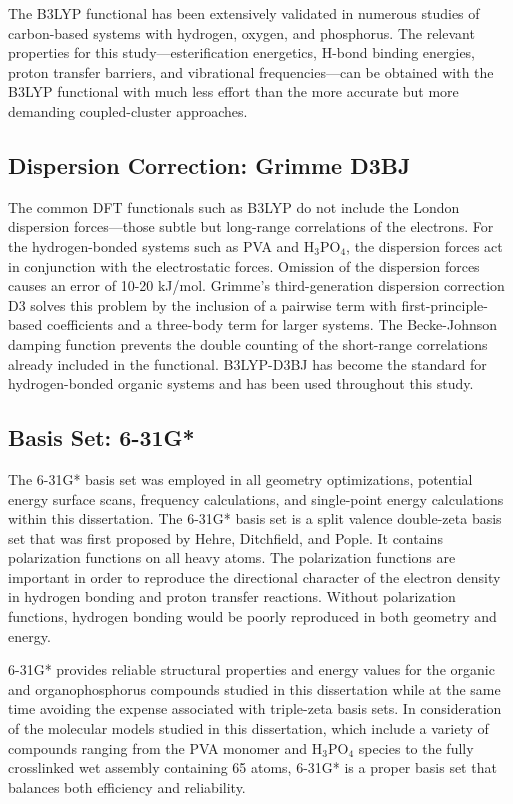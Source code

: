 \documentclass[12pt,a4paper]{report}
\begin{document}
The B3LYP functional has been extensively validated in numerous studies of carbon-based systems with hydrogen, oxygen, and phosphorus.\cite{72,73} The relevant properties for this study—esterification energetics, H-bond binding energies, proton transfer barriers, and vibrational frequencies—can be obtained with the B3LYP functional with much less effort than the more accurate but more demanding coupled-cluster approaches.

\subsection{Dispersion Correction: Grimme D3BJ}
The common DFT functionals such as B3LYP do not include the London dispersion forces—those subtle but long-range correlations of the electrons. For the hydrogen-bonded systems such as PVA and H\(_3\)PO\(_4\), the dispersion forces act in conjunction with the electrostatic forces. Omission of the dispersion forces causes an error of 10-20 kJ/mol. \cite{74} Grimme’s third-generation dispersion correction D3 solves this problem by the inclusion of a pairwise term with first-principle-based coefficients and a three-body term for larger systems.\cite{74} The Becke-Johnson damping function prevents the double counting of the short-range correlations already included in the functional.\cite{75} B3LYP-D3BJ has become the standard for hydrogen-bonded organic systems and has been used throughout this study.

\subsection{Basis Set: 6-31G*}
The 6-31G* basis set was employed in all geometry optimizations, potential energy surface scans, frequency calculations, and single-point energy calculations within this dissertation.\cite{76} The 6-31G* basis set is a split valence double-zeta basis set that was first proposed by Hehre, Ditchfield, and Pople. It contains polarization functions on all heavy atoms. The polarization functions are important in order to reproduce the directional character of the electron density in hydrogen bonding and proton transfer reactions.\cite{76} Without polarization functions, hydrogen bonding would be poorly reproduced in both geometry and energy.

6-31G* provides reliable structural properties and energy values for the organic and organophosphorus compounds studied in this dissertation while at the same time avoiding the expense associated with triple-zeta basis sets. In consideration of the molecular models studied in this dissertation, which include a variety of compounds ranging from the PVA monomer and H\(_3\)PO\(_4\) species to the fully crosslinked wet assembly containing 65 atoms, 6-31G* is a proper basis set that balances both efficiency and reliability.
\end{document}
